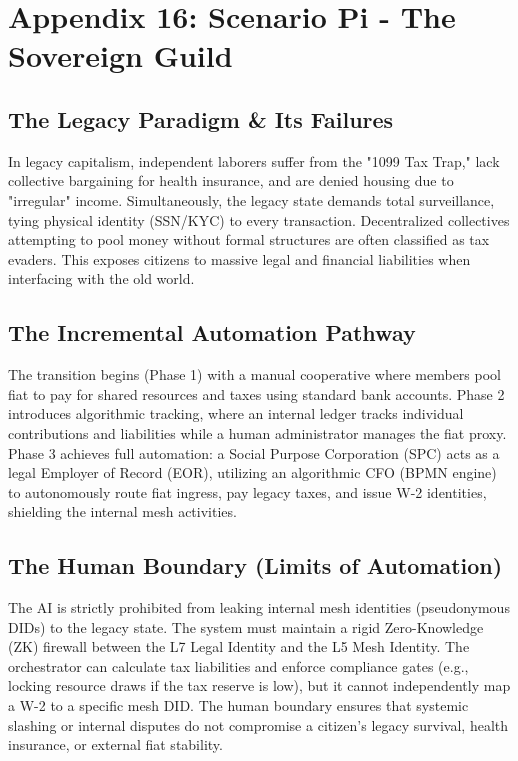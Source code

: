 \chapter{Appendix 16: Scenario Pi - The Sovereign Guild}

\section{The Legacy Paradigm \& Its Failures}
In legacy capitalism, independent laborers suffer from the "1099 Tax Trap," lack collective bargaining for health insurance, and are denied housing due to "irregular" income. Simultaneously, the legacy state demands total surveillance, tying physical identity (SSN/KYC) to every transaction. Decentralized collectives attempting to pool money without formal structures are often classified as tax evaders. This exposes citizens to massive legal and financial liabilities when interfacing with the old world.

\section{The Incremental Automation Pathway}
The transition begins (Phase 1) with a manual cooperative where members pool fiat to pay for shared resources and taxes using standard bank accounts. Phase 2 introduces algorithmic tracking, where an internal ledger tracks individual contributions and liabilities while a human administrator manages the fiat proxy. Phase 3 achieves full automation: a Social Purpose Corporation (SPC) acts as a legal Employer of Record (EOR), utilizing an algorithmic CFO (BPMN engine) to autonomously route fiat ingress, pay legacy taxes, and issue W-2 identities, shielding the internal mesh activities.

\section{The Human Boundary (Limits of Automation)}
The AI is strictly prohibited from leaking internal mesh identities (pseudonymous DIDs) to the legacy state. The system must maintain a rigid Zero-Knowledge (ZK) firewall between the L7 Legal Identity and the L5 Mesh Identity. The orchestrator can calculate tax liabilities and enforce compliance gates (e.g., locking resource draws if the tax reserve is low), but it cannot independently map a W-2 to a specific mesh DID. The human boundary ensures that systemic slashing or internal disputes do not compromise a citizen's legacy survival, health insurance, or external fiat stability.

